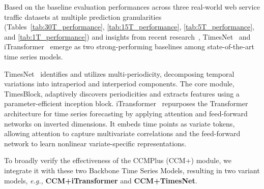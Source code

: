 


Based on the baseline evaluation performances across three real-world web service traffic datasets at multiple prediction granularities (Tables~\ref{tab:30T_performance}, \ref{tab:15T_performance}, \ref{tab:5T_performance}, and \ref{tab:1T_performance}) and insights from recent research~\cite{qiu2024tfb,wang2024deep}, TimesNet~\cite{wutimesnet} and iTransformer~\cite{liuitransformer} emerge as two strong-performing baselines among state-of-the-art time series models.

TimesNet~\cite{wutimesnet} identifies and utilizes multi-periodicity, decomposing temporal variations into intraperiod and interperiod components. The core module, TimesBlock, adaptively discovers periodicities and extracts features using a parameter-efficient inception block. iTransformer~\cite{liuitransformer} repurposes the Transformer architecture for time series forecasting by applying attention and feed-forward networks on inverted dimensions. It embeds time points as variate tokens, allowing attention to capture multivariate correlations and the feed-forward network to learn nonlinear variate-specific representations.

To broadly verify the effectiveness of the CCMPlus (CCM+) module, we integrate it with these two Backbone Time Series Models, resulting in two variant models, \textit{e.g.,} \textbf{CCM+iTransformer} and \textbf{CCM+TimesNet}.


